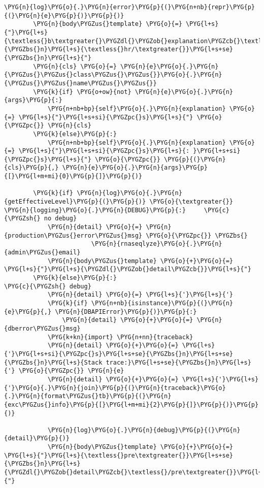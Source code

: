 \begin{Verbatim}[commandchars=\\\{\}]
        \PYG{n}{log}\PYG{o}{.}\PYG{n}{error}\PYG{p}{(}\PYG{n+nb}{repr}\PYG{p}{(}\PYG{n}{e}\PYG{p}{)}\PYG{p}{)}
        \PYG{n}{body\PYGZus{}template} \PYG{o}{=} \PYG{l+s}{"}\PYG{l+s}{\textless{}b\textgreater{}\PYGZdl{}\PYGZob{}explanation\PYGZcb{}\textless{}/b\textgreater{}}\PYG{l+s+se}{\PYGZbs{}n}\PYG{l+s}{\textless{}hr/\textgreater{}}\PYG{l+s+se}{\PYGZbs{}n}\PYG{l+s}{"}
        \PYG{n}{cls} \PYG{o}{=} \PYG{n}{e}\PYG{o}{.}\PYG{n}{\PYGZus{}\PYGZus{}class\PYGZus{}\PYGZus{}}\PYG{o}{.}\PYG{n}{\PYGZus{}\PYGZus{}name\PYGZus{}\PYGZus{}}
        \PYG{k}{if} \PYG{o+ow}{not} \PYG{n}{e}\PYG{o}{.}\PYG{n}{args}\PYG{p}{:}
            \PYG{n+nb+bp}{self}\PYG{o}{.}\PYG{n}{explanation} \PYG{o}{=} \PYG{l+s}{"}\PYG{l+s+si}{\PYGZpc{}s}\PYG{l+s}{"} \PYG{o}{\PYGZpc{}} \PYG{n}{cls}
        \PYG{k}{else}\PYG{p}{:}
            \PYG{n+nb+bp}{self}\PYG{o}{.}\PYG{n}{explanation} \PYG{o}{=} \PYG{l+s}{"}\PYG{l+s+si}{\PYGZpc{}s}\PYG{l+s}{: }\PYG{l+s+si}{\PYGZpc{}s}\PYG{l+s}{"} \PYG{o}{\PYGZpc{}} \PYG{p}{(}\PYG{n}{cls}\PYG{p}{,} \PYG{n}{e}\PYG{o}{.}\PYG{n}{args}\PYG{p}{[}\PYG{l+m+mi}{0}\PYG{p}{]}\PYG{p}{)}

        \PYG{k}{if} \PYG{n}{log}\PYG{o}{.}\PYG{n}{getEffectiveLevel}\PYG{p}{(}\PYG{p}{)} \PYG{o}{\textgreater{}} \PYG{n}{logging}\PYG{o}{.}\PYG{n}{DEBUG}\PYG{p}{:}     \PYG{c}{\PYGZsh{} no debug}
            \PYG{n}{detail} \PYG{o}{=} \PYG{n}{production\PYGZus{}error\PYGZus{}msg} \PYG{o}{\PYGZpc{}} \PYGZbs{}
                        \PYG{n}{rnaseqlyze}\PYG{o}{.}\PYG{n}{admin\PYGZus{}email}
            \PYG{n}{body\PYGZus{}template} \PYG{o}{+}\PYG{o}{=} \PYG{l+s}{"}\PYG{l+s}{\PYGZdl{}\PYGZob{}detail\PYGZcb{}}\PYG{l+s}{"}
        \PYG{k}{else}\PYG{p}{:}                                           \PYG{c}{\PYGZsh{} debug}
            \PYG{n}{detail} \PYG{o}{=} \PYG{l+s}{'}\PYG{l+s}{'}
            \PYG{k}{if} \PYG{n+nb}{isinstance}\PYG{p}{(}\PYG{n}{e}\PYG{p}{,} \PYG{n}{DBAPIError}\PYG{p}{)}\PYG{p}{:}
                \PYG{n}{detail} \PYG{o}{+}\PYG{o}{=} \PYG{n}{dberror\PYGZus{}msg}
            \PYG{k+kn}{import} \PYG{n+nn}{traceback}
            \PYG{n}{detail} \PYG{o}{+}\PYG{o}{=} \PYG{l+s}{'}\PYG{l+s+si}{\PYGZpc{}s}\PYG{l+s+se}{\PYGZbs{}n}\PYG{l+s+se}{\PYGZbs{}n}\PYG{l+s}{Stack trace:}\PYG{l+s+se}{\PYGZbs{}n}\PYG{l+s}{'} \PYG{o}{\PYGZpc{}} \PYG{n}{e}
            \PYG{n}{detail} \PYG{o}{+}\PYG{o}{=} \PYG{l+s}{'}\PYG{l+s}{'}\PYG{o}{.}\PYG{n}{join}\PYG{p}{(}\PYG{n}{traceback}\PYG{o}{.}\PYG{n}{format\PYGZus{}tb}\PYG{p}{(}\PYG{n}{exc\PYGZus{}info}\PYG{p}{[}\PYG{l+m+mi}{2}\PYG{p}{]}\PYG{p}{)}\PYG{p}{)}

            \PYG{n}{log}\PYG{o}{.}\PYG{n}{debug}\PYG{p}{(}\PYG{n}{detail}\PYG{p}{)}
            \PYG{n}{body\PYGZus{}template} \PYG{o}{+}\PYG{o}{=} \PYG{l+s}{"}\PYG{l+s}{\textless{}pre\textgreater{}}\PYG{l+s+se}{\PYGZbs{}n}\PYG{l+s}{\PYGZdl{}\PYGZob{}detail\PYGZcb{}\textless{}/pre\textgreater{}}\PYG{l+s}{"}


\end{Verbatim}
